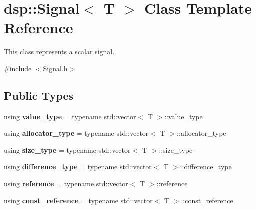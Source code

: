 \hypertarget{classdsp_1_1_signal}{}\section{dsp\+:\+:Signal$<$ T $>$ Class Template Reference}
\label{classdsp_1_1_signal}


This class represents a scalar signal.  




{\ttfamily \#include $<$Signal.\+h$>$}

\subsection*{Public Types}
\begin{DoxyCompactItemize}
\item 
\mbox{\label{classdsp_1_1_signal_aaaabb30292daaf8f51f25e081ceacd59}} 
using {\bfseries value\+\_\+type} = typename std\+::vector$<$ T $>$\+::value\+\_\+type
\item 
\mbox{\label{classdsp_1_1_signal_a1362dba3fc632d0422078c877a3e8afe}} 
using {\bfseries allocator\+\_\+type} = typename std\+::vector$<$ T $>$\+::allocator\+\_\+type
\item 
\mbox{\label{classdsp_1_1_signal_a97ed0d971f6db03d39194cde43810131}} 
using {\bfseries size\+\_\+type} = typename std\+::vector$<$ T $>$\+::size\+\_\+type
\item 
\mbox{\label{classdsp_1_1_signal_a1e79b50488917f95da990b14765fbbae}} 
using {\bfseries difference\+\_\+type} = typename std\+::vector$<$ T $>$\+::difference\+\_\+type
\item 
\mbox{\label{classdsp_1_1_signal_a0a1d24e23ea6f33a792fed79e1148c6b}} 
using {\bfseries reference} = typename std\+::vector$<$ T $>$\+::reference
\item 
\mbox{\label{classdsp_1_1_signal_a32ff51ee955e5cb97a5545995bfd8971}} 
using {\bfseries const\+\_\+reference} = typename std\+::vector$<$ T $>$\+::const\+\_\+reference
\item 
\mbox{\label{classdsp_1_1_signal_a00277d9776ca433d4778fb312a48f0b6}} 

\end{DoxyCompactItemize}
